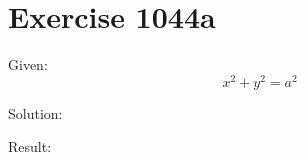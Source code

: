 \documentclass[a4paper, 10pt]{scrartcl}
\begin{document}
\section{Exercise 1044a}

Given:
\[
x^{2} + y^{2} = a^{2}
\]

Solution:

Result:
\end{document}
